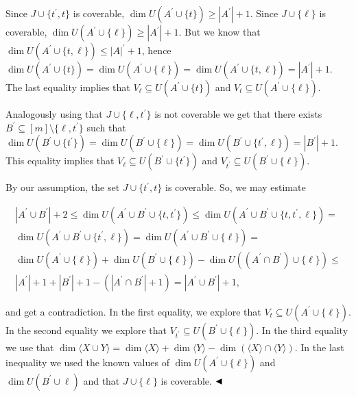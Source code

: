 \documentclass[10pt,a4paper]{article}
\begin{document}
Since $J\cup\{t^{\prime},t\}$ is coverable, $\dim U(A^{\prime}\cup\{t\})\geq|A^{\prime}|+1$.
Since $J\cup\{\ell\}$ is coverable, $\dim U(A^{\prime}\cup\{\ell\})\geq|A^{\prime}|+1$. But we know that $\dim U(A^{\prime}\cup\{t,\ell\})\leq|A|^{\prime}+1$, hence
$\dim U(A^{\prime}\cup\{t\})=\dim U(A^{\prime}\cup\{\ell\})=\dim U(A^{\prime}\cup\{t,\ell\})=|A^{\prime}|+1$. The last equality implies that $V_{\ell}\subseteq U(A^{\prime}\cup\{t\})$ and
$V_{t}\subseteq U(A^{\prime}\cup\{\ell\})$.\par



Analogously using that $J\cup\{\ell,t^{\prime}\}$ is not coverable we get that there exists $B^{\prime}\subseteq[m]\setminus\{\ell,t^{\prime}\}$ such that
$\dim U(B^{\prime}\cup\{t^{\prime}\})=\dim U(B^{\prime}\cup\{\ell\})=\dim U(B^{\prime}\cup\{t^{\prime},\ell\})=|B^{\prime}|+1$. This equality implies that $V_{\ell}\subseteq U(B^{\prime}\cup\{t^{\prime}\})$ and
$V_{t^{\prime}}\subseteq U(B^{\prime}\cup\{\ell\})$.\par



By our assumption, the set $J\cup\{t^{\prime},t\}$ is coverable. So, we may estimate\par





 
\[\begin{gathered}|A^{\prime}\cup B^{\prime}|+2\leq\dim U(A^{\prime}\cup B^{\prime}\cup\{t,t^{\prime}\})\leq\dim U(A^{\prime}\cup B^{\prime}\cup\{t,t^{\prime},\ell\})=\\
\dim U(A^{\prime}\cup B^{\prime}\cup\{t^{\prime},\ell\})=\dim U(A^{\prime}\cup
B^{\prime}\cup\{\ell\})=\\
\dim U(A^{\prime}\cup\{\ell\})+\dim U(B^{\prime}\cup\{\ell\})-\dim U((A^{\prime}\cap B^{\prime})\cup\{\ell\})\leq\\
|A^{\prime}|+1+|B^{\prime}|+1-(|A^{\prime}\cap B^{\prime}|+1)=|A^{\prime}\cup B^{\prime}|+1,\end{gathered}\] 
 





and get a contradiction.
In the first equality, we explore that $V_{t}\subseteq U(A^{\prime}\cup\{\ell\})$. In the second equality we explore that $V_{t^{\prime}}\subseteq U(B^{\prime}\cup\{\ell\})$.
In the third equality we use that $\dim\langle X\cup Y\rangle=\dim\langle X\rangle+\dim\langle Y\rangle-\dim(\langle X\rangle\cap\langle Y\rangle)$. In the last inequality we used the known values of $\dim U(A^{\prime}\cup\{\ell\})$ and $\dim U(B^{\prime}\cup\ell)$ and that $J\cup\{\ell\}$ is coverable.
$\hfill\blacktriangleleft$\par
\end{document}
